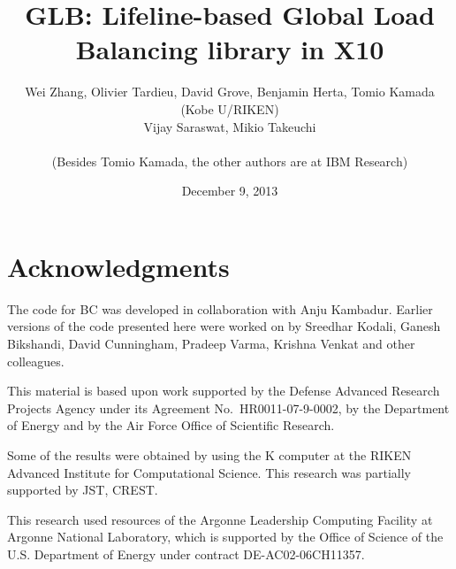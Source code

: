 \documentclass[twocolumn,DIV=20,letterpaper,9pt]{scrartcl}
\begin{document}
\title{GLB: Lifeline-based Global Load Balancing library in X10}
\author{Wei Zhang, Olivier Tardieu, David Grove, Benjamin Herta, Tomio Kamada (Kobe U/{\sc RIKEN}) \\ Vijay Saraswat,  Mikio Takeuchi\\
~\\ (Besides Tomio Kamada, the other authors are at IBM Research) 
}
\date{December 9, 2013}

\maketitle

\begin{abstract}

\end{abstract}
 



 


\section*{Acknowledgments}
The code for BC was developed in collaboration with Anju
Kambadur. Earlier versions of the code presented here were worked on
by Sreedhar Kodali, Ganesh Bikshandi, David Cunningham, Pradeep Varma,
Krishna Venkat and other colleagues.  

This material is based upon work supported by the Defense Advanced
Research Projects Agency under its Agreement No.~HR0011-07-9-0002, 
by the Department of Energy and by the Air Force Office of Scientific
Research. 

Some of the results were obtained by using the K computer at the RIKEN
Advanced Institute for Computational Science.  This research was
partially supported by JST, CREST.

This research used resources of the Argonne Leadership Computing
Facility at Argonne National Laboratory, which is supported by the
Office of Science of the U.S. Department of Energy under contract
DE-AC02-06CH11357.



\end{document}
